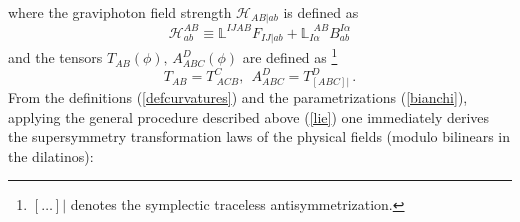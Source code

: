 \documentclass[a4paper,12pt]{article}
\begin{document}
where the graviphoton field strength $\mathcal{H}_{AB|ab}$ is
defined as
\begin{equation}
\mathcal{H}^{AB}_{ab}\equiv\mathbb{L}^{IJAB}F_{IJ\vert
ab}+\mathbb{L}_{I\alpha}^{~~AB}B^{I\alpha}_{ab}
\end{equation}
and the tensors $T_{AB}(\phi),\,A^D_{ABC}(\phi)$ are defined as
\footnote{$\left[\dots\right]\!\vert$ denotes the symplectic
traceless antisymmetrization.}
\begin{equation}
T_{AB}=T^C_{~ACB},~~A^D_{ABC}=T^D_{\left[ABC\right]\vert}\,.
\end{equation}
From the definitions (\ref{defcurvatures}) and the
parametrizations (\ref{bianchi}), applying the general procedure
described above (\ref{lie}) one immediately derives the
supersymmetry transformation laws of the physical fields (modulo
bilinears in the dilatinos):
\end{document}
